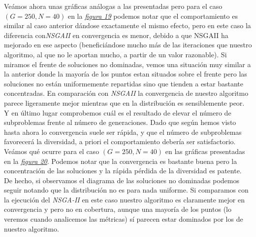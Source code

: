 Veámos ahora unas gráficas análogas a las presentadas pero para el caso $(G=250, N=40)$ en la \hyperref[fig:19]{\textit{figura 19}} podemos notar que el comportamiento es similar al caso anterior dándose exactamente el mismo efecto, pero en este caso la diferencia con\textit{NSGAII} en convergencia es menor, debido a que NSGAII ha mejorado en ese aspecto (beneficiándose mucho más de las iteraciones que nuestro algoritmo, al que no le aportan mucho, a partir de un valor razonable). Si miramos el frente de soluciones no dominadas, vemos una situación muy similar a la anterior donde la mayoría de los puntos estan situados sobre el frente pero las soluciones no están uniformemente repartidas sino que tienden a estar bastante concentradas. En comparación con \textit{NSGAII} la convergencia de nuestro algoritmo parece ligeramente mejor mientras que en la distribución es sensiblemente peor.\\

Y en último lugar comprobemos cuál es el resultado de elevar el número de subproblemas frente al número de generaciones. Dado que según hemos visto hasta ahora lo convergencia suele ser rápida, y que el número de subproblemas favorecerá la diversidad, a priori el comportamiento debería ser satisfactorio. Veámos qué ocurre para el caso $(G=250, N=40)$ en las gráficas presentadas en la \hyperref[fig:20]{\textit{figura 20}}. Podemos notar que la convergencia es bastante buena pero la concentración de las soluciones y la rápida pérdida de la diversidad es patente. De hecho, si observamos el diagrama de las soluciones no dominadas podemos seguir notando que la distribución no es para nada uniforme. Si comparamos con la ejecución del \textit{NSGA-II} en este caso nuestro algoritmo es claramente mejor en convergencia y pero no en cobertura, aunque una mayoría de los puntos (lo veremos cuando analicemos las métricas) sí parecen estar dominados por los de nuestro algoritmo. \\


